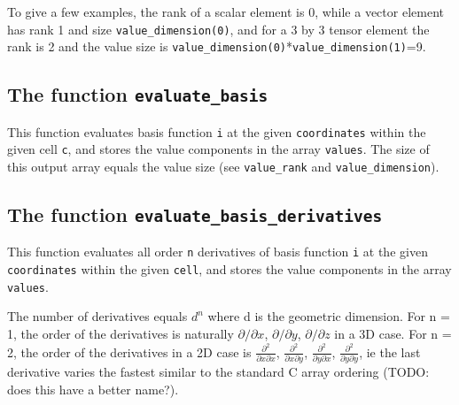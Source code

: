 To give a few examples, the rank of a scalar element is 0, while a vector element has rank 1 and size \texttt{value\_dimension(0)}, 
and for a 3 by 3 tensor element the rank is 2 and the value size is \texttt{value\_dimension(0)}*\texttt{value\_dimension(1)}=9.


\subsection{The function \texttt{evaluate\_basis}}
This function evaluates basis function \texttt{i} at the given \texttt{coordinates}
within the given cell \texttt{c}, and stores the value components in the array \texttt{values}.
The size of this output array equals the value size (see \texttt{value\_rank} and \texttt{value\_dimension}).


\subsection{The function \texttt{evaluate\_basis\_derivatives}}
This function evaluates all order \texttt{n} derivatives of basis function \texttt{i}
at the given \texttt{coordinates} within the given \texttt{cell},
and stores the value components in the array \texttt{values}.

The number of derivatives equals $d^n$ where d is the geometric dimension.
For n = 1, the order of the derivatives is naturally
$\partial/\partial x$, $\partial/\partial y$, $\partial/\partial z$
in a 3D case.
For n = 2, the order of the derivatives in a 2D case is 
  $\frac{\partial^2}{\partial x\partial x}$,
  $\frac{\partial^2}{\partial x\partial y}$,
  $\frac{\partial^2}{\partial y\partial x}$,
  $\frac{\partial^2}{\partial y\partial y}$,
ie the last derivative varies the fastest similar to the standard C array ordering (TODO: does this have a better name?).

